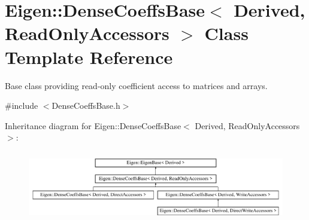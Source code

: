 \hypertarget{class_eigen_1_1_dense_coeffs_base_3_01_derived_00_01_read_only_accessors_01_4}{}\section{Eigen\+::Dense\+Coeffs\+Base$<$ Derived, Read\+Only\+Accessors $>$ Class Template Reference}
\label{class_eigen_1_1_dense_coeffs_base_3_01_derived_00_01_read_only_accessors_01_4}


Base class providing read-\/only coefficient access to matrices and arrays.  




{\ttfamily \#include $<$Dense\+Coeffs\+Base.\+h$>$}

Inheritance diagram for Eigen\+::Dense\+Coeffs\+Base$<$ Derived, Read\+Only\+Accessors $>$\+:\begin{figure}[H]
\begin{center}
\leavevmode
\includegraphics[height=3.111111cm]{class_eigen_1_1_dense_coeffs_base_3_01_derived_00_01_read_only_accessors_01_4}
\end{center}
\end{figure}
